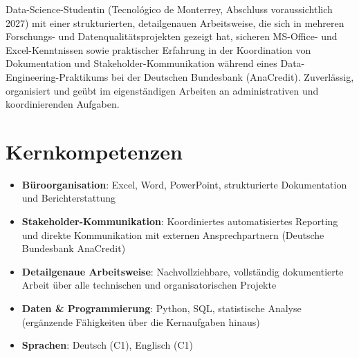 \documentclass[11pt,a4paper,sans]{moderncv}
\begin{document}
\makecvtitle


\vspace{6pt}
\small{Data-Science-Studentin (Tecnológico de Monterrey, Abschluss voraussichtlich 2027) mit einer strukturierten, detailgenauen Arbeitsweise, die sich in mehreren Forschungs- und Datenqualitätsprojekten gezeigt hat, sicheren MS-Office- und Excel-Kenntnissen sowie praktischer Erfahrung in der Koordination von Dokumentation und Stakeholder-Kommunikation während eines Data-Engineering-Praktikums bei der Deutschen Bundesbank (AnaCredit). Zuverlässig, organisiert und geübt im eigenständigen Arbeiten an administrativen und koordinierenden Aufgaben.}


\section{Kernkompetenzen}
\vspace{1pt}
\begin{itemize}

\item \textbf{Büroorganisation}: Excel, Word, PowerPoint, strukturierte Dokumentation und Berichterstattung

\item \textbf{Stakeholder-Kommunikation}: Koordiniertes automatisiertes Reporting und direkte Kommunikation mit externen Ansprechpartnern (Deutsche Bundesbank AnaCredit)

\item \textbf{Detailgenaue Arbeitsweise}: Nachvollziehbare, vollständig dokumentierte Arbeit über alle technischen und organisatorischen Projekte

\item \textbf{Daten \& Programmierung}: Python, SQL, statistische Analyse (ergänzende Fähigkeiten über die Kernaufgaben hinaus)

\item \textbf{Sprachen}: Deutsch (C1), Englisch (C1)

\end{itemize}

\end{document}
